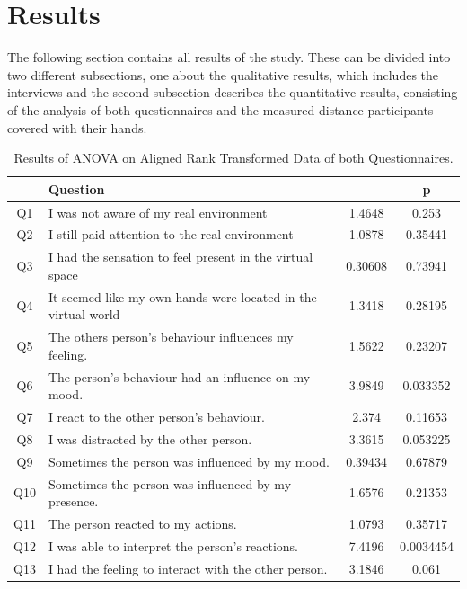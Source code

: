 \documentclass[english,runningheads,a4paper]{llncs}[2018/03/10]
\begin{document}
\section{Results}
\label{sec:results}
The following section contains all results of the study. 
These can be divided into two different subsections, one about the qualitative results, which includes the interviews and the second subsection describes the quantitative results, consisting of the analysis of both questionnaires and the measured distance participants covered with their hands. 

\begin{table}[tb]
    \centering
    \caption{Results of ANOVA on Aligned Rank Transformed Data of both Questionnaires.}
    
    \begin{tabularx}{\textwidth}{c@{\hskip 0.3cm} X@{\hskip 0.5cm} S[round-mode=places,round-precision=3] S[round-mode=places,round-precision=3]}
        \toprule 
        & Question &  & p \\
        \midrule
        Q1 & I was not aware of my real environment  & 1.4648 & 0.253 \\
        Q2 & I still paid attention to the real environment  & 1.0878 & 0.35441 \\
        Q3 & I had the sensation to feel present in the virtual space &  0.30608 &  0.73941  \\
        Q4 & It seemed like my own hands were located in the virtual world &  1.3418 &  0.28195  \\
        Q5 & The others person's behaviour influences my feeling. & 1.5622 & 0.23207\\
        Q6 & The person's behaviour had an influence on my mood.  & 3.9849 & 0.033352 \\
        Q7 & I react to the other person's behaviour.& 2.374& 0.11653 \\
        Q8 & I was distracted by the other person.&3.3615 & 0.053225\\
        Q9 & Sometimes the person was influenced by my mood.& 0.39434& 0.67879 \\
        Q10 & Sometimes the person was influenced by my presence.& 1.6576& 0.21353 \\
        Q11 & The person reacted to my actions. &1.0793 &0.35717 \\
        Q12 & I was able to interpret the person's reactions. &7.4196 & 0.0034454\\
        Q13 & I had the feeling to interact with the other person. & 3.1846&0.061 \\

\end{tabularx}
\end{table}
\end{document}
